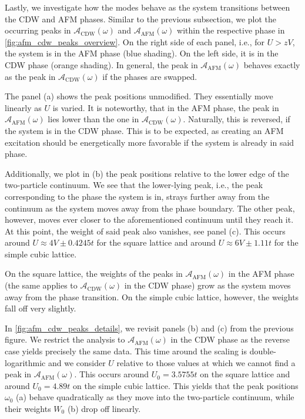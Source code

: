 \documentclass[
    reprint, 
    aps,
    preprintnumbers,
    twocolumn,
    prb,
    superscriptaddress
]{revtex4-2}
\newcommand{\spectral}[1]{\mathcal{A}_\text{#1}  (\omega)}
\begin{document}
Lastly, we investigate how the modes behave as the system transitions between the CDW and AFM phases.
Similar to the previous subsection, we plot the occurring peaks in $\spectral{CDW}$ and $\spectral{AFM}$ within the respective phase in \autoref{fig:afm_cdw_peaks_overview}.
On the right side of each panel, i.e., for $U > zV$, the system is in the AFM phase (blue shading).
On the left side, it is in the CDW phase (orange shading).
In general, the peak in $\spectral{AFM}$ behaves exactly as the peak in $\spectral{CDW}$ if the phases are swapped.

The panel (a) shows the peak positions unmodified. They essentially move linearly as $U$ is varied.
It is noteworthy, that in the AFM phase, the peak in $\spectral{AFM}$ lies lower than the one in $\spectral{CDW}$.
Naturally, this is reversed, if the system is in the CDW phase.
This is to be expected, as creating an AFM excitation should be energetically more favorable if the system is already in said phase.

Additionally, we plot in (b) the peak positions relative to the lower edge of the two-particle continuum.
We see that the lower-lying peak, i.e., the peak corresponding to the phase the system is in, 
strays further away from the continuum as the system moves away from the phase boundary.
The other peak, however, moves ever closer to the aforementioned continuum until they reach it.
At this point, the weight of said peak also vanishes, see panel (c).
This occurs around $U \approx 4V \pm 0.4245t$ for the square lattice and around $U \approx 6V \pm 1.11t$ for the simple cubic lattice.

On the square lattice, the weights of the peaks in $\spectral{AFM}$ in the AFM phase (the same applies to $\spectral{CDW}$ in the CDW phase) grow as the system moves away from the phase transition.
On the simple cubic lattice, however, the weights fall off very slightly.

In \autoref{fig:afm_cdw_peaks_details}, we revisit panels (b) and (c) from the previous figure.
We restrict the analysis to $\spectral{AFM}$ in the CDW phase as the reverse case yields precisely the same data.
This time around the scaling is double-logarithmic and we consider $U$ relative to those values at which we cannot find a peak in $\spectral{AFM}$.
This occurs around $U_0 = 3.5755t$ on the square lattice and around $U_0 = 4.89t$ on the simple cubic lattice.
This yields that the peak positions $\omega_0$ (a) behave quadratically as they move into the two-particle continuum,
while their weights $W_0$ (b) drop off linearly.
\end{document}
